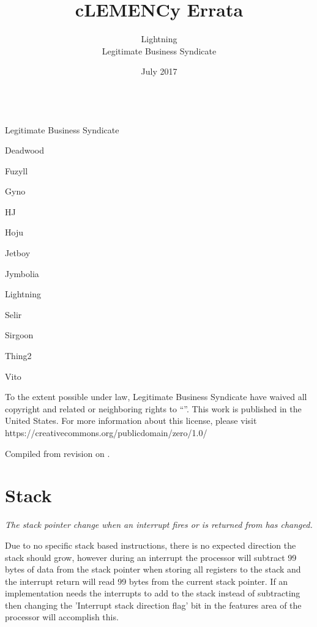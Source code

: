 \documentclass[oneside]{book}
\title{cLEMENCy Errata}
\date{July 2017}
\author{Lightning\\ Legitimate Business Syndicate}
\begin{document}
\frontmatter
\thispagestyle{plain}
\begin{center}
  \centering
      {
        \LARGE \thetitle
      }
      \\[2em]
      {
          \Large Legitimate Business Syndicate
      }
      \\[1em]

      \begin{itemize*}[label=]
      \item Deadwood
      \item Fuzyll
      \item Gyno
      \item HJ
      \item Hoju
      \item Jetboy
      \item Jymbolia
      \item Lightning
      \item Selir
      \item Sirgoon
      \item Thing2
      \item Vito
      \end{itemize*}
\end{center}

      To the extent possible under law, Legitimate Business Syndicate have waived all
      copyright and related or neighboring rights to ``\thetitle''. This work is
      published in the United States. For more information about this license, please
      visit https://creativecommons.org/publicdomain/zero/1.0/

      Compiled from revision
      \texttt{} on .

\newpage
\mainmatter

\setcounter{chapter}{1}
\setcounter{section}{1}

\section{Stack}

\textit{The stack pointer change when an interrupt fires or is returned from has
  changed.}

Due to no specific stack based instructions, there is no expected direction the stack should grow, however during an interrupt the processor will subtract 99 bytes of data from the stack pointer when storing all registers to the stack and the interrupt return will read 99 bytes from the current stack pointer. If an implementation needs the interrupts to add to the stack instead of subtracting then changing the 'Interrupt stack direction flag' bit in the features area of the processor will accomplish this.
\end{document}
